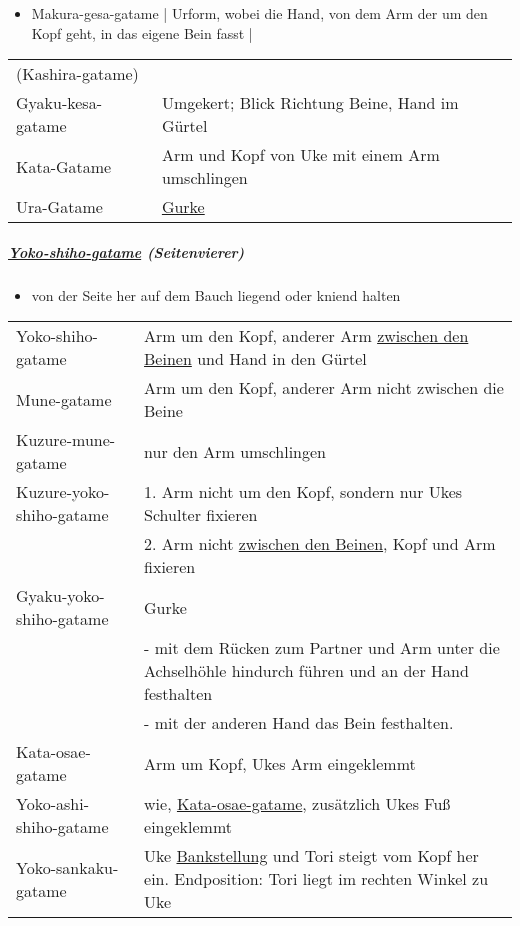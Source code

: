 \documentclass[justified, a4paper, notitlepage, captions=tableheading, nobib]{tufte-handout}
\begin{document}
\begin{itemize}
\item \label{org8cba9ce}Makura-gesa-gatame | Urform, wobei die Hand, von dem Arm der um den Kopf geht, in das eigene Bein fasst     |
\end{itemize}
\begin{center}
\begin{tabular}{ll}
(Kashira-gatame) & \\
\label{org27a5e4b}Gyaku-kesa-gatame & Umgekert; Blick Richtung Beine, Hand im Gürtel\\
\label{orga0a7671}Kata-Gatame & Arm und Kopf von Uke mit einem Arm umschlingen\\
\label{org554c172}Ura-Gatame & \hyperref[org0e38d7b]{Gurke}\\
\end{tabular}
\end{center}

\subparagraph{\hyperref[org71c73b9]{Yoko-shiho-gatame} (Seitenvierer)}
\label{sec:org302f9d4}
\begin{itemize}
\item von der Seite her auf dem Bauch liegend oder kniend halten
\end{itemize}

\begin{center}
\begin{tabular}{ll}
\label{org71c73b9}Yoko-shiho-gatame & Arm um den Kopf, anderer Arm \hyperref[orgf285c69]{zwischen den Beinen} und Hand in den Gürtel\\
\label{org8525577}Mune-gatame & Arm um den Kopf, anderer Arm nicht zwischen die Beine\\
\label{org3fcd979}Kuzure-mune-gatame & nur den Arm umschlingen\\
\label{orgf859fc8}Kuzure-yoko-shiho-gatame & 1. Arm nicht um den Kopf, sondern nur Ukes Schulter fixieren\\
 & 2. Arm nicht \hyperref[orgf285c69]{zwischen den Beinen}, Kopf und Arm fixieren\\
\label{org5c26289}Gyaku-yoko-shiho-gatame & \label{org0e38d7b}Gurke\\
 & - mit dem Rücken zum Partner und Arm unter die Achselhöhle hindurch führen und an der Hand festhalten\\
 & - mit der anderen Hand das Bein festhalten.\\
\label{org542624a}Kata-osae-gatame & Arm um Kopf, Ukes Arm eingeklemmt\\
\label{org9e30b8c}Yoko-ashi-shiho-gatame & wie, \hyperref[org542624a]{Kata-osae-gatame}, zusätzlich Ukes Fuß eingeklemmt\\
\label{org1b4d553}Yoko-sankaku-gatame & Uke \hyperref[org37bd524]{Bankstellung} und Tori steigt vom Kopf her ein. Endposition: Tori liegt im rechten Winkel zu Uke\\
\end{tabular}
\end{center}
\end{document}
